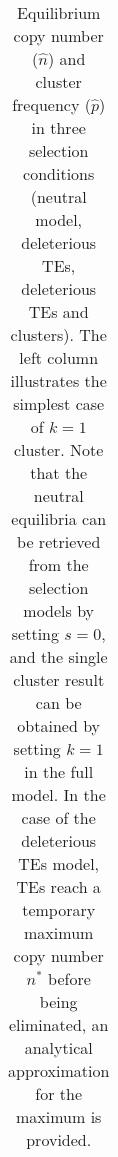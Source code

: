 \documentclass[10pt,a4paper]{article}
\begin{document}
\begin{table}
\begin{adjustwidth}{-2in}{0in}
\begin{flushright}
\begin{tabular}{p{3cm}p{6cm}p{7cm}}
\end{tabular}
\caption{\label{tab:eqs} Equilibrium copy number ($\hat n$) and cluster frequency ($\hat p$) in three selection conditions (neutral model, deleterious TEs, deleterious TEs and clusters). The left column illustrates the simplest case of $k=1$ cluster. Note that the neutral equilibria can be retrieved from the selection models by setting $s=0$, and the single cluster result can be obtained by setting $k=1$ in the full model. In the case of the deleterious TEs model, TEs reach a temporary maximum copy number $n^\ast$ before being eliminated, an analytical approximation for the maximum is provided. }
\end{flushright}\end{adjustwidth}
\end{table}



\printbibliography
\end{document}
